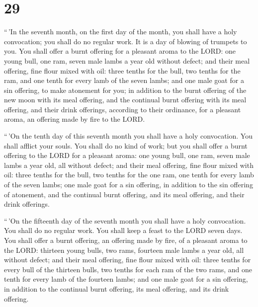 \hypertarget{section-28}{%
\section{29}\label{section-28}}

 ``\,'In the seventh month, on the first day of the month,
you shall have a holy convocation; you shall do no regular work. It is a
day of blowing of trumpets to you.  You shall offer a burnt
offering for a pleasant aroma to the LORD: one young bull, one ram,
seven male lambs a year old without defect;  and their meal
offering, fine flour mixed with oil: three tenths for the bull, two
tenths for the ram,  and one tenth for every lamb of the
seven lambs;  and one male goat for a sin offering, to make
atonement for you;  in addition to the burnt offering of the
new moon with its meal offering, and the continual burnt offering with
its meal offering, and their drink offerings, according to their
ordinance, for a pleasant aroma, an offering made by fire to the LORD.

 ``\,'On the tenth day of this seventh month you shall have
a holy convocation. You shall afflict your souls. You shall do no kind
of work;  but you shall offer a burnt offering to the LORD
for a pleasant aroma: one young bull, one ram, seven male lambs a year
old, all without defect;  and their meal offering, fine
flour mixed with oil: three tenths for the bull, two tenths for the one
ram,  one tenth for every lamb of the seven lambs;
 one male goat for a sin offering, in addition to the sin
offering of atonement, and the continual burnt offering, and its meal
offering, and their drink offerings.

 ``\,'On the fifteenth day of the seventh month you shall
have a holy convocation. You shall do no regular work. You shall keep a
feast to the LORD seven days.  You shall offer a burnt
offering, an offering made by fire, of a pleasant aroma to the LORD:
thirteen young bulls, two rams, fourteen male lambs a year old, all
without defect;  and their meal offering, fine flour mixed
with oil: three tenths for every bull of the thirteen bulls, two tenths
for each ram of the two rams,  and one tenth for every lamb
of the fourteen lambs;  and one male goat for a sin
offering, in addition to the continual burnt offering, its meal
offering, and its drink offering.

